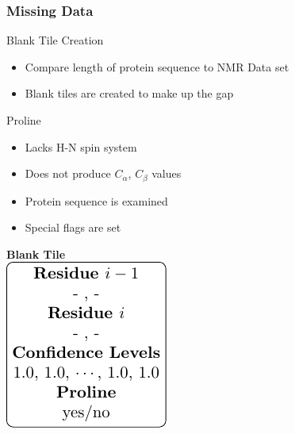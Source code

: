 \documentclass{beamer}
\begin{document}
\begin{frame}
	\frametitle{Missing Data}
	\begin{minipage}{0.45\textwidth}
		\begin{block}{Blank Tile Creation}
			\begin{itemize}
				\item Compare length of protein sequence to NMR Data set
				\item Blank tiles are created to make up the gap
			\end{itemize}
		\end{block}
		\begin{block}{Proline}
			\begin{itemize}
				\item Lacks H-N spin system
				\item Does not produce $C_{\alpha}$, $C_{\beta}$ values
				\item Protein sequence is examined
				\item Special flags are set 
			\end{itemize}
		\end{block}
	\end{minipage}
	\begin{minipage}{0.45\textwidth}
	\begin{center}
		\huge\textbf{Blank Tile}\\
		\vspace {12pt}
		\includegraphics[width=\textwidth]{tile_fig_blank}
	\end{center}
	\end{minipage}
\end{frame}
\end{document}
